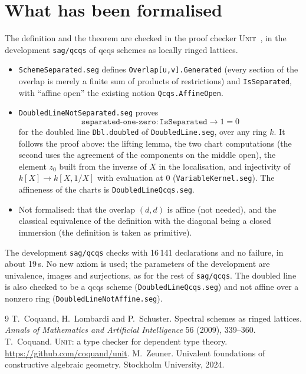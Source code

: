 \documentclass[11pt]{article}
\theoremstyle{remark}
\newcommand{\kw}[1]{\texttt{#1}}
\begin{document}
\section{What has been formalised}

The definition and the theorem are checked in the proof checker
\textsc{Unit}~\cite{Unit}, in the development \texttt{sag/qcqs} of qcqs
schemes as locally ringed lattices.
\begin{itemize}
\item \texttt{SchemeSeparated.seg} defines \kw{Overlap[u,v].Generated}
  (every section of the overlap is merely a finite sum of products of
  restrictions) and \kw{IsSeparated}, with ``affine open'' the existing
  notion \kw{Qcqs.AffineOpen}.
\item \texttt{DoubledLineNotSeparated.seg} proves
  \[
    \kw{separated-one-zero} : \kw{IsSeparated}\to 1=0
  \]
  for the doubled line \kw{Dbl.doubled} of \texttt{DoubledLine.seg}, over
  any ring $k$. It follows the proof above: the lifting
  lemma, the two chart computations (the second uses the agreement of the
  components on the middle open), the element $z_0$ built from the
  inverse of $X$ in the localisation, and injectivity of
  $k[X]\to k[X,1/X]$ with evaluation at $0$
  (\texttt{VariableKernel.seg}). The affineness of the charts is
  \texttt{DoubledLineQcqs.seg}.
\item Not formalised: that the overlap $(d,d)$ is affine (not needed),
  and the classical equivalence of the definition with the diagonal
  being a closed immersion (the definition is taken as primitive).
\end{itemize}
The development \texttt{sag/qcqs} checks with 16\,141 declarations and no
failure, in about 19\,s. No new axiom is used; the parameters of the
development are univalence, images and surjections, as for the rest of
\texttt{sag/qcqs}. The doubled line is also checked to be a qcqs scheme
(\texttt{DoubledLineQcqs.seg}) and not affine over a nonzero ring
(\texttt{DoubledLineNotAffine.seg}).

\begin{thebibliography}{9}
 T.~Coquand, H.~Lombardi and P.~Schuster. Spectral schemes
  as ringed lattices. \emph{Annals of Mathematics and Artificial
  Intelligence} 56 (2009), 339--360.
 T.~Coquand. \textsc{Unit}: a type checker for dependent
  type theory. \url{https://github.com/coquand/unit}.
 M.~Zeuner. Univalent foundations of constructive
  algebraic geometry. Stockholm University, 2024.
\end{thebibliography}
\end{document}
